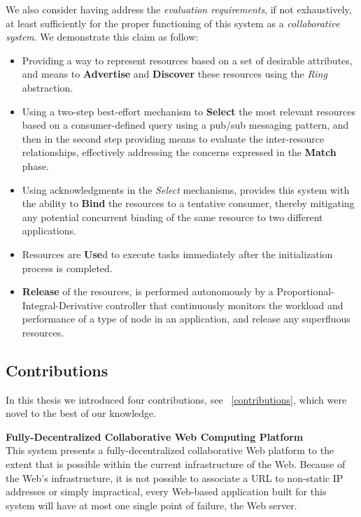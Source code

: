 \documentclass[12pt, titlepage]{uo_temp}
\begin{document}
     We also consider having address the \emph{evaluation requirements}, if not
     exhaustively, at least sufficiently for the proper functioning of this system as a
     \emph{collaborative system}. We demonstrate this claim  as follow:
     \begin{itemize}
       \item Providing a way to represent resources based on a set of desirable
         attributes, and means to \textbf{Advertise} and \textbf{Discover} these resources
         using the \emph{Ring} abstraction.
       \item Using a two-step best-effort mechanism to \textbf{Select} the most relevant
         resources based on a consumer-defined query using a pub/sub messaging pattern,
         and then in the second step providing means to evaluate the inter-resource
         relationships, effectively addressing the concerns expressed in the
         \textbf{Match} phase.
       \item Using acknowledgments in the \emph{Select} mechanisms, provides this system
         with the ability to \textbf{Bind} the resources to a tentative consumer, thereby
         mitigating any potential concurrent binding of the same resource to two different
         applications.
       \item Resources are \textbf{Use}d to execute tasks immediately after the
         initialization process is completed. 
       \item \textbf{Release} of the resources, is performed autonomously by a
         Proportional-Integral-Derivative controller that continuously monitors the
         workload and performance of a type of node in an application, and release any
         superfluous resources.
     \end{itemize}
     
     \subsection{Contributions}
     In this thesis we introduced four contributions, see ~\ref{contributions}, which were
     novel to the best of our knowledge. 
     
     \textbf{Fully-Decentralized Collaborative Web Computing Platform}\\
     This system presents a fully-decentralized collaborative Web platform to the extent
     that is possible within the current infrastructure of the Web. Because of the Web's
     infrastructure, it is not possible to associate a URL to non-static IP addresses or
     simply impractical, every Web-based application built for this system will have at
     most one single point of failure, the Web server. 
    
\end{document}
